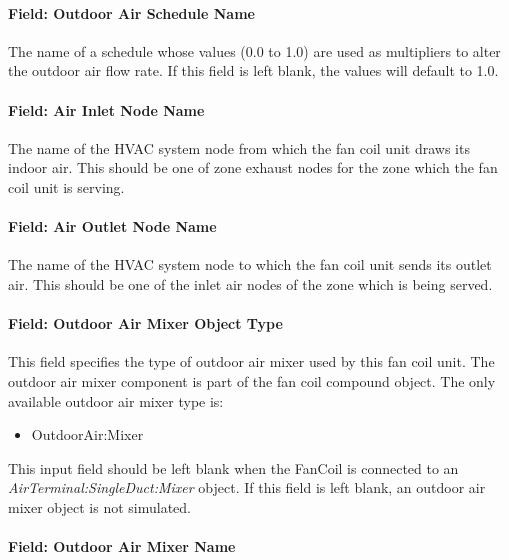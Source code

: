 \paragraph{Field: Outdoor Air Schedule Name}\label{field-outdoor-air-schedule-name-000}

The name of a schedule whose values (0.0 to 1.0) are used as multipliers to alter the outdoor air flow rate. If this field is left blank, the values will default to 1.0.

\paragraph{Field: Air Inlet Node Name}\label{field-air-inlet-node-name-009}

The name of the HVAC system node from which the fan coil unit draws its indoor air. This should be one of zone exhaust nodes for the zone which the fan coil unit is serving.

\paragraph{Field: Air Outlet Node Name}\label{field-air-outlet-node-name-008}

The name of the HVAC system node to which the fan coil unit sends its outlet air. This should be one of the inlet air nodes of the zone which is being served.

\paragraph{Field: Outdoor Air Mixer Object Type}\label{field-outdoor-air-mixer-object-type-000}

This field specifies the type of outdoor air mixer used by this fan coil unit. The outdoor air mixer component is part of the fan coil compound object. The only available outdoor air mixer type is:

\begin{itemize}
\tightlist
\item
  OutdoorAir:Mixer
\end{itemize}

This input field should be left blank when the FanCoil is connected to an \textit{AirTerminal:SingleDuct:Mixer} object. If this field is left blank, an outdoor air mixer object is not simulated. 

\paragraph{Field: Outdoor Air Mixer Name}\label{field-outdoor-air-mixer-name-000}

